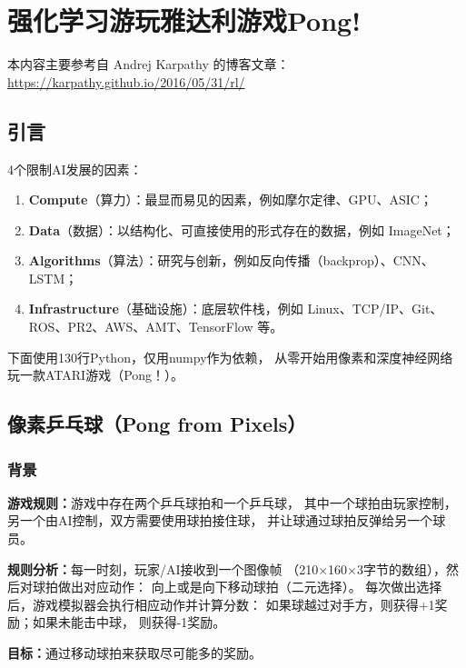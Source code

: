 \chapter{强化学习游玩雅达利游戏Pong!}
\label{app:pong}

本内容主要参考自 Andrej Karpathy 的博客文章：
\url{https://karpathy.github.io/2016/05/31/rl/}

\section{引言}

4个限制AI发展的因素：

\begin{enumerate}[
  label=（\arabic*）,
  labelindent=\parindent,
  labelwidth=!,
  leftmargin=*,
  labelsep=0.4em,
  parsep=0.5em
]
  \item \textbf{Compute}（算力）：最显而易见的因素，例如摩尔定律、GPU、ASIC；
  \item \textbf{Data}（数据）：以结构化、可直接使用的形式存在的数据，例如 ImageNet；
  \item \textbf{Algorithms}（算法）：研究与创新，例如反向传播（backprop）、CNN、LSTM；
  \item \textbf{Infrastructure}（基础设施）：底层软件栈，例如 Linux、TCP/IP、Git、ROS、PR2、AWS、AMT、TensorFlow 等。
\end{enumerate}

下面使用130行Python，仅用numpy作为依赖，
从零开始用像素和深度神经网络玩一款ATARI游戏（Pong！）。

\section{像素乒乓球（Pong from Pixels）}

\subsection{背景}

\textbf{游戏规则：}游戏中存在两个乒乓球拍和一个乒乓球，
其中一个球拍由玩家控制，另一个由AI控制，双方需要使用球拍接住球，
并让球通过球拍反弹给另一个球员。

\textbf{规则分析：}每一时刻，玩家/AI接收到一个图像帧
（210×160×3字节的数组），然后对球拍做出对应动作：
向上或是向下移动球拍（二元选择）。
每次做出选择后，游戏模拟器会执行相应动作并计算分数：
如果球越过对手方，则获得+1奖励；如果未能击中球，
则获得-1奖励。

\textbf{目标：}通过移动球拍来获取尽可能多的奖励。

